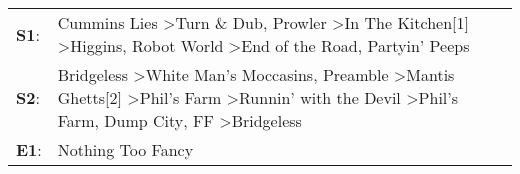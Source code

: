 \begin{supertabular}{p{0.03\textwidth}p{0.92\textwidth}}
 \textbf{S1}:  &                                                                                                              Cummins Lies\textsuperscript{} \textgreater \enspace Turn \& Dub\textsuperscript{}, \enspace Prowler\textsuperscript{} \textgreater \enspace In The Kitchen[1]\textsuperscript{} \textgreater \enspace Higgins\textsuperscript{}, \enspace Robot World\textsuperscript{} \textgreater \enspace End of the Road\textsuperscript{}, \enspace Partyin' Peeps\textsuperscript{}  \enspace  \\
 \textbf{S2}:  &  Bridgeless\textsuperscript{} \textgreater \enspace White Man's Moccasins\textsuperscript{}, \enspace Preamble\textsuperscript{} \textgreater \enspace Mantis Ghetts[2]\textsuperscript{} \textgreater \enspace Phil's Farm\textsuperscript{} \textgreater \enspace Runnin' with the Devil\textsuperscript{} \textgreater \enspace Phil's Farm\textsuperscript{}, \enspace Dump City\textsuperscript{}, \enspace FF\textsuperscript{} \textgreater \enspace Bridgeless\textsuperscript{}  \enspace  \\
 \textbf{E1}:  &                                                                                                                                                                                                                                                                                                                                                                                                                                                      Nothing Too Fancy\textsuperscript{}  \enspace  \\
\end{supertabular}
